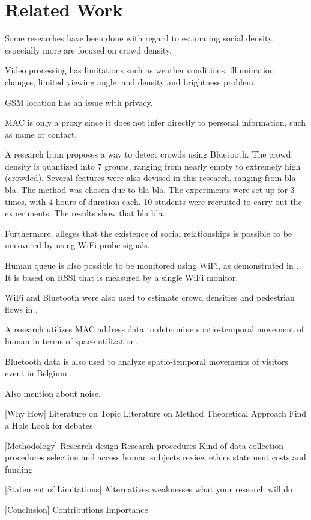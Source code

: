 \chapter{Related Work}\label{ch:related-work}

Some researches have been done with regard to estimating social density, especially more are focused on crowd density.

Video processing has limitations such as weather conditions, illumination changes, limited viewing angle, and density and brightness problem. 

GSM location has an issue with privacy\cite{thesis017}.

MAC is only a proxy since it does not infer directly to personal information, such as name or contact.

A research from \cite{thesis008} proposes a way to detect crowds using Bluetooth. The crowd density is quantized into 7 groups, ranging from nearly empty to extremely high (crowded). Several features were also devised in this research, ranging from bla bla. 
The method was chosen due to bla bla.
The experiments were set up for 3 times, with 4 hours of duration each. 10 students were recruited to carry out the experiments.
The results show that bla bla.

Furthermore, \cite{thesis014} alleges that the existence of social relationships is possible to be uncovered by using WiFi probe signals.

Human queue is also possible to be monitored using WiFi, as demonstrated in \cite{thesis012}. It is based on RSSI that is measured by a single WiFi monitor.

WiFi and Bluetooth were also used to estimate crowd densities and pedestrian flows in \cite{thesis011}.

A research \cite{thesis017} utilizes MAC address data to determine spatio-temporal movement of human in terms of space utilization.

Bluetooth data is also used to analyze spatio-temporal movements of visitors event in Belgium \cite{thesis016}.


Also mention about noise.


[Why How]
Literature on Topic
Literature on Method
Theoretical Approach
Find a Hole
Look for debates


[Methodology]
Research design
Research procedures
Kind of data
collection procedures
selection and access
human subjects review
ethics statement
costs and funding

[Statement of Limitations]
Alternatives
weaknesses
what your research will do

[Conclusion]
Contributions
Importance
